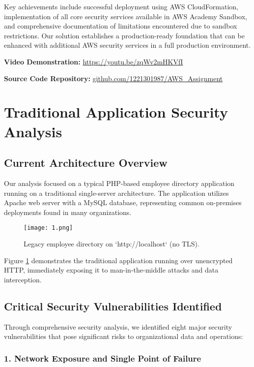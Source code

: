 \documentclass[12pt]{article}
\begin{document}
Key achievements include successful deployment using AWS CloudFormation, implementation of all core security services available in AWS Academy Sandbox, and comprehensive documentation of limitations encountered due to sandbox restrictions. Our solution establishes a production-ready foundation that can be enhanced with additional AWS security services in a full production environment.

\textbf{Video Demonstration:} \href{https://youtu.be/zqWv2mHKVfI}{https://youtu.be/zqWv2mHKVfI}

\textbf{Source Code Repository:} \href{https://github.com/1221301987/AWS_Assignment}{github.com/1221301987/AWS\_Assignment}

\section{Traditional Application Security Analysis}

\subsection{Current Architecture Overview}

Our analysis focused on a typical PHP-based employee directory application running on a traditional single-server architecture. The application utilizes Apache web server with a MySQL database, representing common on-premises deployments found in many organizations.

\begin{figure}[H]
\centering
\texttt{[image: 1.png]}
\caption{Legacy employee directory on `http://localhost` (no TLS).}
\label{fig:traditional_app}
\end{figure}

Figure \ref{fig:traditional_app} demonstrates the traditional application running over unencrypted HTTP, immediately exposing it to man-in-the-middle attacks and data interception.

\subsection{Critical Security Vulnerabilities Identified}

Through comprehensive security analysis, we identified eight major security vulnerabilities that pose significant risks to organizational data and operations:

\subsubsection{1. Network Exposure and Single Point of Failure}
\end{document}
